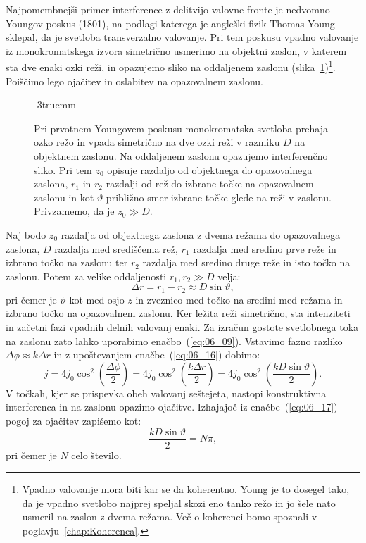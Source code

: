 Najpomembnejši primer interference z delitvijo valovne fronte je nedvomno
Youngov poskus (1801), na podlagi katerega je angleški fizik Thomas Young
sklepal, da je svetloba transverzalno valovanje. 
Pri tem poskusu vpadno valovanje iz monokromatskega izvora  
simetrično usmerimo na objektni zaslon, v katerem sta dve enaki ozki
reži, in opazujemo sliko na oddaljenem zaslonu 
(slika~\ref{fig:06_Young})\footnote{Vpadno valovanje mora biti 
kar se da koherentno. Young je to dosegel tako, da je vpadno svetlobo najprej 
speljal skozi eno tanko režo in jo šele nato usmeril na zaslon z dvema režama. 
Več o koherenci bomo spoznali v poglavju~\ref{chap:Koherenca}.}. Poiščimo 
lego ojačitev in oslabitev na opazovalnem zaslonu.
\begin{figure}[ht]
\centering
\def\svgwidth{100truemm} 

\caption{Pri prvotnem Youngovem poskusu monokromatska svetloba prehaja ozko 
režo in vpada simetrično na dve ozki reži v razmiku $D$ na objektnem zaslonu. 
Na oddaljenem zaslonu opazujemo interferenčno sliko. Pri tem $z_0$ opisuje razdaljo
od objektnega do opazovalnega zaslona, $r_1$ in 
$r_2$ razdalji od rež do izbrane točke na opazovalnem zaslonu in kot 
$\vartheta$ približno smer izbrane točke glede na reži v zaslonu. 
Privzamemo, da je $z_0 \gg D$.}
\label{fig:06_Young}
\vglue-3truemm
\end{figure}

Naj bodo $z_0$ razdalja od objektnega zaslona z dvema režama 
do opazovalnega zaslona, $D$ razdalja med središčema rež, 
$r_1$ razdalja med sredino prve reže in izbrano točko na zaslonu
ter $r_2$ razdalja med sredino druge reže in isto točko na zaslonu. Potem za velike 
oddaljenosti $r_1, r_2 \gg D$ velja:
\begin{equation}
\Delta r = r_1-r_2 \approx D \sin\vartheta,
\label{eq:06_16}
\end{equation}
pri čemer je $\vartheta$ kot med osjo $z$ in zveznico med točko na sredini med režama in
izbrano točko na opazovalnem zaslonu. Ker ležita reži simetrično, sta intenziteti in začetni fazi vpadnih delnih
valovanj enaki. Za izračun gostote svetlobnega toka na zaslonu 
zato lahko uporabimo enačbo~(\ref{eq:06_09}). Vstavimo fazno razliko $\Delta \phi \approx 
k\Delta r$ in z upoštevanjem enačbe~(\ref{eq:06_16}) dobimo:
\begin{equation}
j = 4 j_0 \cos^2\left(\frac{\Delta \phi}{2}\right) = 4j_0 \cos^2\left(\frac{k\Delta r}{2}\right) = 
4j_0 \cos^2\left(\frac{kD\sin \vartheta}{2}\right)\!\!.
\label{eq:06_17}
\end{equation}
V točkah, kjer se prispevka obeh valovanj seštejeta, nastopi 
konstruktivna interferenca in na zaslonu opazimo ojačitve. 
Izhajajoč iz enačbe~(\ref{eq:06_17}) pogoj za ojačitev zapišemo kot:
\begin{equation}
\frac{kD\sin \vartheta}{2} = N\pi,
\label{eq:06_18}
\end{equation}
pri čemer je $N$ celo število. 


